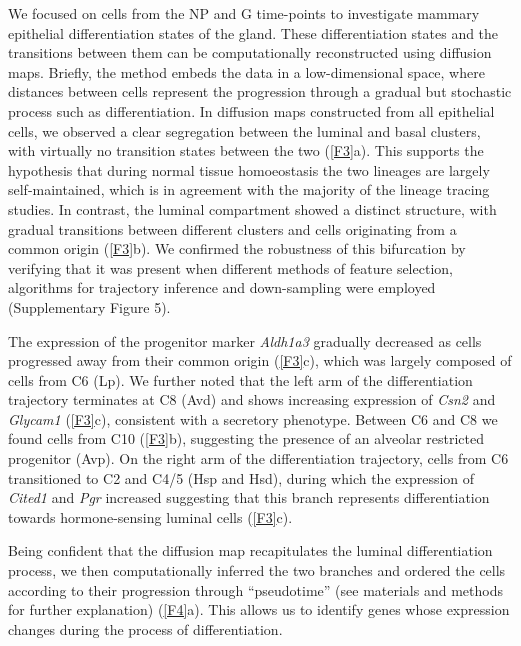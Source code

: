 \documentclass[titlepage, 12pt, oneside]{amsart}
\begin{document}
We focused on cells from the NP and G time-points to investigate mammary epithelial differentiation states of the gland.
These differentiation states and the transitions between them can be computationally reconstructed using diffusion maps.
Briefly, the method embeds the data in a low-dimensional space, where distances between cells represent the progression through a gradual but stochastic process such as differentiation.
In diffusion maps constructed from all epithelial cells, we observed a clear segregation between the luminal and basal clusters, with virtually no transition states between the two (\autoref{F3}a).
This supports the hypothesis that during normal tissue homoeostasis the two lineages are largely self-maintained, which is in agreement with the majority of the lineage tracing studies\autocite{VanKeymeulen2011,VanAmerongen2012,Davis2016}.
In contrast, the luminal compartment showed a distinct structure, with gradual transitions between different clusters and cells originating from a common origin (\autoref{F3}b).
We confirmed the robustness of this bifurcation by verifying that it was present when different methods of feature selection, algorithms for trajectory inference and down-sampling were employed (Supplementary Figure 5).

The expression of the progenitor marker \textit{Aldh1a3} gradually decreased as cells progressed away from their common origin (\autoref{F3}c), which was largely composed of cells from C6 (Lp).  
We further noted that the left arm of the differentiation trajectory terminates at C8 (Avd) and shows increasing expression of \textit{Csn2} and \textit{Glycam1} (\autoref{F3}c), consistent with a secretory phenotype.
Between C6 and C8 we found cells from C10 (\autoref{F3}b), suggesting the presence of an alveolar restricted progenitor (Avp).
On the right arm of the differentiation trajectory, cells from C6 transitioned to C2 and C4/5 (Hsp and Hsd), during which the expression of \textit{Cited1} and \textit{Pgr} increased suggesting that this branch represents differentiation towards hormone-sensing luminal cells (\autoref{F3}c).

Being confident that the diffusion map recapitulates the luminal differentiation process, we then computationally inferred the two branches and ordered the cells according to their progression through ``pseudotime''\autocite{Haghverdi2016} (see materials and methods for further explanation) (\autoref{F4}a).
This allows us to identify genes whose expression changes during the process of differentiation.\\
\end{document}
